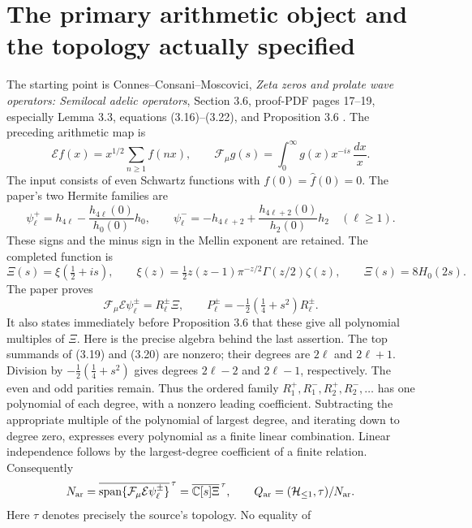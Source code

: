 \section{The primary arithmetic object and the topology actually specified}
\label{sec:cq-source}
The starting point is Connes--Consani--Moscovici,
\emph{Zeta zeros and prolate wave operators: Semilocal adelic operators},
Section 3.6, proof-PDF pages 17--19, especially Lemma 3.3,
equations (3.16)--(3.22), and Proposition 3.6
\cite{cqCCM}. The preceding arithmetic map is
\[
 \mathcal E f(x)=x^{1/2}\sum_{n\geq1}f(nx),\qquad
 \mathcal F_\mu g(s)=\int_0^\infty g(x)x^{-is}\,\frac{dx}{x}.
\]
The input consists of even Schwartz functions with
$f(0)=\widehat f(0)=0$. The paper's two Hermite families are
\[
 \psi_\ell^+=h_{4\ell}-\frac{h_{4\ell}(0)}{h_0(0)}h_0,
 \qquad
 \psi_\ell^-=-h_{4\ell+2}
       +\frac{h_{4\ell+2}(0)}{h_2(0)}h_2\quad(\ell\geq1).
\]
These signs and the minus sign in the Mellin exponent are retained.
The completed function is
\begin{equation}\label{eq:cq-Xi}
 \Xi(s)=\xi(\tfrac12+is),\qquad
 \xi(z)=\tfrac12z(z-1)\pi^{-z/2}\Gamma(z/2)\zeta(z),
 \qquad \Xi(s)=8H_0(2s).
\end{equation}
The paper proves
\begin{equation}\label{eq:cq-image}
 \mathcal F_\mu\mathcal E\psi_\ell^\pm=R_\ell^\pm\Xi,
 \qquad P_\ell^\pm=-\tfrac12(\tfrac14+s^2)R_\ell^\pm.
\end{equation}
It also states immediately before Proposition 3.6 that these give all
polynomial multiples of $\Xi$. Here is the precise algebra behind the
last assertion. The top summands of (3.19) and (3.20) are nonzero;
their degrees are $2\ell$ and $2\ell+1$. Division by
$-\tfrac12(\tfrac14+s^2)$ gives degrees $2\ell-2$ and
$2\ell-1$, respectively. The even and odd parities remain.
Thus the ordered family $R_1^+,R_1^-,R_2^+,R_2^-,\ldots$
has one polynomial of each degree, with a nonzero leading coefficient.
Subtracting the appropriate multiple of the polynomial of largest
degree, and iterating down to degree zero, expresses every polynomial
as a finite linear combination. Linear independence follows by the
largest-degree coefficient of a finite relation. Consequently
\begin{equation}\label{eq:cq-N}
 N_{\rm ar}=\overline{\operatorname{span}
 \{\mathcal F_\mu\mathcal E\psi_\ell^\pm\}}^{\,\tau}
 =\overline{\mathbb C[s]\Xi}^{\,\tau},\qquad
 Q_{\rm ar}=(\mathcal H_{\leq 1},\tau)/N_{\rm ar}.
\end{equation}
Here $\tau$ denotes precisely the source's topology. No equality of
